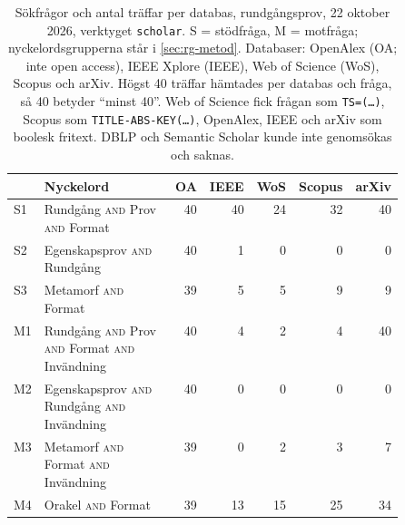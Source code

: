 \begin{table}[!b]
  \caption{Sökfrågor och antal träffar per databas, rundgångsprov,
    22 oktober 2026, verktyget \texttt{scholar}.  S = stödfråga, M =
    motfråga; nyckelordsgrupperna står i \cref{sec:rg-metod}.  Databaser:
    OpenAlex (OA; inte \foreignlanguage{english}{open access}), IEEE
    Xplore (IEEE), Web of Science (WoS), Scopus och arXiv.  Högst 40
    träffar hämtades per databas och fråga, så 40 betyder \enquote{minst
    40}.  Web of Science fick frågan som \texttt{TS=(\dots)}, Scopus som
    \texttt{TITLE-ABS-KEY(\dots)}, OpenAlex, IEEE och arXiv som boolesk
    fritext.  DBLP och Semantic Scholar kunde inte genomsökas och
    saknas.}
  \label{tab:sok-queries-rundgang}
  \centering\footnotesize
  \begin{tabular}{@{}lp{0.5\linewidth}rrrrr@{}}
    \toprule
    & Nyckelord & OA & IEEE & WoS & Scopus & arXiv \\
    \midrule
    S1 & Rundgång \textsc{and} Prov \textsc{and} Format
       & 40 & 40 & 24 & 32 & 40 \\
    S2 & Egenskapsprov \textsc{and} Rundgång & 40 & 1 & 0 & 0 & 0 \\
    S3 & Metamorf \textsc{and} Format & 39 & 5 & 5 & 9 & 9 \\
    \midrule
    M1 & Rundgång \textsc{and} Prov \textsc{and} Format \textsc{and}
         Invändning & 40 & 4 & 2 & 4 & 40 \\
    M2 & Egenskapsprov \textsc{and} Rundgång \textsc{and} Invändning
       & 40 & 0 & 0 & 0 & 0 \\
    M3 & Metamorf \textsc{and} Format \textsc{and} Invändning
       & 39 & 0 & 2 & 3 & 7 \\
    M4 & Orakel \textsc{and} Format & 39 & 13 & 15 & 25 & 34 \\
    \bottomrule
  \end{tabular}
\end{table}

